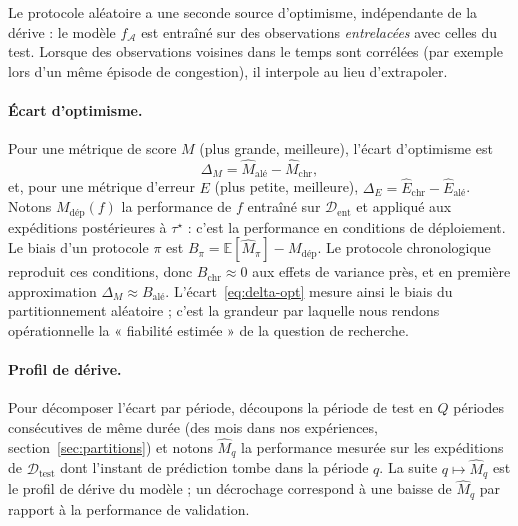 \documentclass[11pt,a4paper]{article}
\newcommand{\E}{\mathbb{E}}
\theoremstyle{definition}
\begin{document}
Le protocole aléatoire a une seconde source d'optimisme, indépendante de la dérive : le modèle $f_{\mathcal{A}}$ est entraîné sur des observations \emph{entrelacées} avec celles du test. Lorsque des observations voisines dans le temps sont corrélées (par exemple lors d'un même épisode de congestion), il interpole au lieu d'extrapoler.

\paragraph{Écart d'optimisme.} Pour une métrique de score $M$ (plus grande, meilleure), l'écart d'optimisme est
\begin{equation}
  \Delta_M = \widehat{M}_{\text{alé}} - \widehat{M}_{\mathrm{chr}},
  \label{eq:delta-opt}
\end{equation}
et, pour une métrique d'erreur $E$ (plus petite, meilleure), $\Delta_E = \widehat{E}_{\mathrm{chr}} - \widehat{E}_{\text{alé}}$. Notons $M_{\text{dép}}(f)$ la performance de $f$ entraîné sur $\mathcal{D}_{\mathrm{ent}}$ et appliqué aux expéditions postérieures à $\tau^\star$ : c'est la performance en conditions de déploiement. Le biais d'un protocole $\pi$ est $B_\pi = \E[\widehat{M}_\pi] - M_{\text{dép}}$. Le protocole chronologique reproduit ces conditions, donc $B_{\mathrm{chr}} \approx 0$ aux effets de variance près, et en première approximation $\Delta_M \approx B_{\text{alé}}$. L'écart~\eqref{eq:delta-opt} mesure ainsi le biais du partitionnement aléatoire ; c'est la grandeur par laquelle nous rendons opérationnelle la « fiabilité estimée » de la question de recherche.

\paragraph{Profil de dérive.} Pour décomposer l'écart par période, découpons la période de test en $Q$ périodes consécutives de même durée (des mois dans nos expériences, section~\ref{sec:partitions}) et notons $\widehat{M}_q$ la performance mesurée sur les expéditions de $\mathcal{D}_{\mathrm{test}}$ dont l'instant de prédiction tombe dans la période $q$. La suite $q \mapsto \widehat{M}_q$ est le profil de dérive du modèle ; un décrochage correspond à une baisse de $\widehat{M}_q$ par rapport à la performance de validation.
\end{document}
